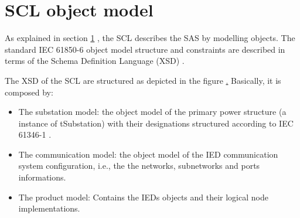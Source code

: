 \section{SCL object model}


As explained in section \ref{} , 
the SCL describes the SAS by modelling objects.
The standard IEC 61850-6 \cite{IEC61850-6:2004} object model 
structure and constraints are described in terms of the 
Schema Definition Language (XSD) .

The XSD of the SCL are structured as depicted 
in the figure \href{fig:pdf-SCL-uml-deept2}. 
Basically, it is composed by: 

\begin{itemize}
  \item The substation model: the object model of the primary power structure
  		(a instance of tSubstation) with their designations structured according to 
  		IEC 61346-1 \cite{IEC61346-1:1996}. 
  \item The communication model: the object model of the IED 
  		communication system configuration, i.e.,
  		the the networks, subnetworks and ports informations.
  \item The product model: Contains the IEDs objects and their 
  		logical node implementations. 	
\end{itemize}


